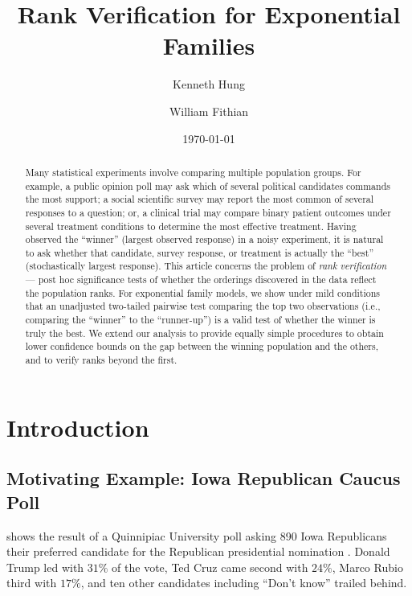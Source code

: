 \documentclass[11pt]{article}
\theoremstyle{definition}
\theoremstyle{custom}
\begin{document}
\title{Rank Verification for Exponential Families}
\author{Kenneth Hung \and William Fithian}
\date{\today}
\maketitle

\begin{abstract}
Many statistical experiments involve comparing multiple population groups. For example, a public opinion poll may ask which of several political candidates commands the most support; a social scientific survey may report the most common of several responses to a question; or, a clinical trial may compare binary patient outcomes under several treatment conditions to determine the most effective treatment. Having observed the ``winner'' (largest observed response) in a noisy experiment, it is natural to ask whether that candidate, survey response, or treatment is actually the ``best'' (stochastically largest response). This article concerns the problem of {\em rank verification} --- post hoc significance tests of whether the orderings discovered in the data reflect the population ranks. For exponential family models, we show under mild conditions that an unadjusted two-tailed pairwise test comparing the top two observations (i.e., comparing the ``winner'' to the ``runner-up'') is a valid test of whether the winner is truly the best. We extend our analysis to provide equally simple procedures to obtain lower confidence bounds on the gap between the winning population and the others, and to verify ranks beyond the first.
\end{abstract}

\section{Introduction}
\label{sec:intro}

\subsection{Motivating Example: Iowa Republican Caucus Poll}
\label{sec:iowa}

 shows the result of a Quinnipiac University poll asking 890 Iowa Republicans their preferred candidate for the Republican presidential nomination \citep{quinnipiac}. Donald Trump led with $31\%$ of the vote, Ted Cruz came second with $24\%$, Marco Rubio third with $17\%$, and ten other candidates including ``Don't know'' trailed behind. 
\end{document}
